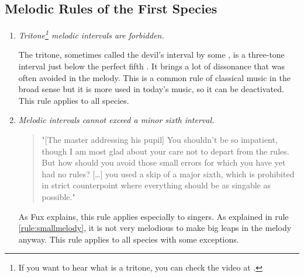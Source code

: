 \subsection{Melodic Rules of the First Species}
\begin{enumerate}[wide, label=\bfseries 1.M\arabic*]
    \item\label{rule:notritone} \textit{Tritone\footnote{If you want to hear what is a tritone, you can check the video  at  \parencite{TritoneYT}.} melodic intervals are forbidden.} \parencite[p.59]{GaPFr}

    The tritone, sometimes called the devil's interval by some \parencite[p.35]{GaPEng}, is a three-tone interval just below the perfect fifth \parencite{Tritone}. It brings a lot of dissonance that was often avoided in the melody. This is a common rule of classical music in the broad sense but it is more used in today's music, so it can be deactivated. This rule applies to all species.
    
    \item\label{rule:mlesixth} \textit{Melodic intervals cannot exceed a minor sixth interval.} \parencite[p.61]{GaPFr}
    \begin{quotation}
        "[The master addressing his pupil] You shouldn't be so impatient, though I am most glad about your care not to depart from the rules. But how should you avoid those small errors for which you have yet had no rules? [\dots] you used a skip of a major sixth, which is prohibited in strict counterpoint where everything should be as singable as possible."
        \textcite[p.37]{GaPEng}
    \end{quotation}

    As Fux explains, this rule applies especially to singers. As explained in rule \ref{rule:smallmelody}, it is not very melodious to make big leaps in the melody anyway. This rule applies to all species with some exceptions.
\end{enumerate}

